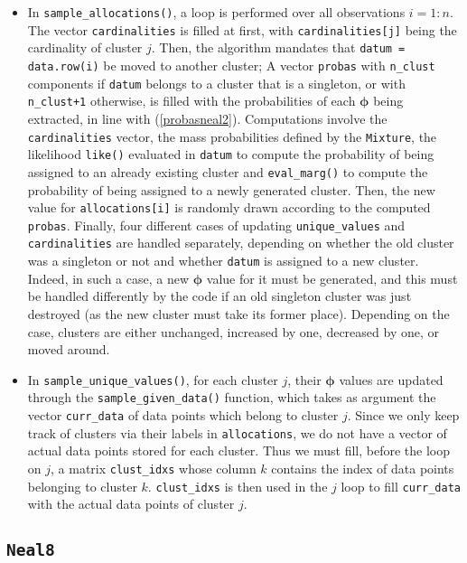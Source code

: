 \begin{itemize}

	\item In \verb|sample_allocations()|, a loop is performed over all observations $i=1:n$.
	The vector \verb|cardinalities| is filled at first, with \verb|cardinalities[j]| being the cardinality of cluster $j$.
	Then, the algorithm mandates that \verb|datum = data.row(i)| be moved to another cluster;
	A vector \verb|probas| with \verb|n_clust| components if \verb|datum| belongs to a cluster that is a singleton, or with \verb|n_clust+1| otherwise, is filled with the probabilities of each $\boldsymbol\phi$ being extracted, in line with (\ref{probasneal2}).
	Computations involve the \verb|cardinalities| vector, the mass probabilities defined by the \verb|Mixture|, the likelihood \verb|like()| evaluated in \verb|datum| to compute the probability of being assigned to an already existing cluster and \verb|eval_marg()| to compute the probability of being assigned to a newly generated cluster. Then, the new value for \verb|allocations[i]| is randomly drawn according to the computed \verb|probas|.
	Finally, four different cases of updating \verb|unique_values| and \verb|cardinalities| are handled separately, depending on whether the old cluster was a singleton or not and whether \verb|datum| is assigned to a new cluster.
	Indeed, in such a case, a new $\boldsymbol\phi$ value for it must be generated, and this must be handled differently by the code if an old singleton cluster was just destroyed (as the new cluster must take its former place).
	Depending on the case, clusters are either unchanged, increased by one, decreased by one, or moved around.
	
	\item In \verb|sample_unique_values()|, for each cluster $j$, their $\boldsymbol\phi$ values are updated through the \verb|sample_given_data()| function, which takes as argument the vector \verb|curr_data| of data points which belong to cluster $j$.
	Since we only keep track of clusters via their labels in \verb|allocations|, we do not have a vector of actual data points stored for each cluster.
	Thus we must fill, before the loop on $j$, a matrix \verb|clust_idxs| whose column $k$ contains the index of data points belonging to cluster $k$.
	\verb|clust_idxs| is then used in the $j$ loop to fill \verb|curr_data| with the actual data points of cluster $j$.

\end{itemize}


\subsection{\texttt{Neal8}}

